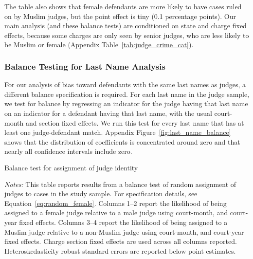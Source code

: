 \documentclass[12pt,english]{article}
\newcommand{\HOME}{\string~}
\newcommand{\curpath}{\HOME/ddl/justice-overleaf}
\newcommand{\curpath}{.}
\begin{document}
\begin{appendices}
{  The table also shows that female defendants are more likely to have cases ruled on by Muslim judges, but the point effect is tiny (0.1 percentage points). Our main analysis (and these balance tests) are conditioned on state and charge fixed effects, because some charges are only seen by senior judges, who are less likely to be Muslim or female (Appendix Table~\ref{tab:judge_crime_cat}).}

\subsubsection{Balance Testing for Last Name Analysis}
\label{appsec:name_balance}

For our analysis of bias toward defendants with the same last names as judges, a different balance specification is required. For each last name in the judge sample, we test for balance by regressing an indicator for the judge having that last name on an indicator for a defendant having that last name, with the usual court-month and section fixed effects. We run this test for every last name that has at least one judge-defendant match. Appendix Figure~\ref{fig:last_name_balance} shows that the distribution of coefficients is concentrated around zero and that nearly all confidence intervals include zero.

\clearpage 

\begin{table}
\begin{center}
\caption{Balance test for assignment of judge identity}
\label{tab:balance}

\begin{minipage}{0.95\textwidth}
   {\footnotesize \emph{Notes:} This table reports results from a balance test of random assignment of judges to cases in the study sample. For specification details, see Equation~\ref{eq:random_female}. Columns 1--2 report the likelihood of being assigned to a female judge relative to a male judge using court-month, and court-year fixed effects. Columns 3--4 report the likelihood of being assigned to a Muslim judge relative to a non-Muslim judge using court-month, and court-year fixed effects. Charge section fixed effects are used across all columns reported. Heteroskedasticity robust standard errors are reported below point estimates. } \\
\end{minipage}
\end{center}
\end{table}


\end{appendices}
\end{document}
